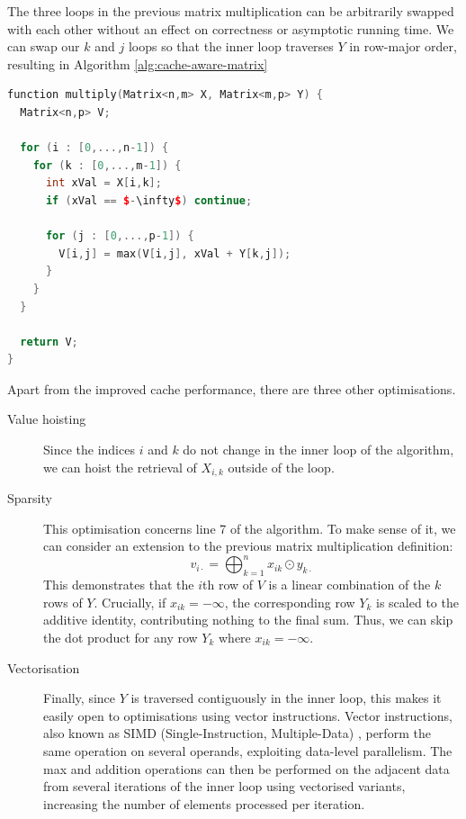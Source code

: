 The three loops in the previous matrix multiplication can be arbitrarily swapped with each other without an effect 
on correctness or asymptotic running time. We can swap our $k$ and $j$ loops so that the inner loop traverses $Y$ in 
row-major order, resulting in Algorithm \ref{alg:cache-aware-matrix}

\begin{algfloat}[ht]
\begin{lstlisting}[mathescape=true, language=C++]
function multiply(Matrix<n,m> X, Matrix<m,p> Y) {
  Matrix<n,p> V;

  for (i : [0,...,n-1]) {
    for (k : [0,...,m-1]) {
      int xVal = X[i,k];
      if (xVal == $-\infty$) continue;

      for (j : [0,...,p-1]) {
        V[i,j] = max(V[i,j], xVal + Y[k,j]);
      }
    }
  }

  return V;
}
\end{lstlisting}
\caption{Cache-aware matrix multiplication algorithm}
\label{alg:cache-aware-matrix}
\end{algfloat}

Apart from the improved cache performance, there are three other optimisations.

\begin{description}
  \item[Value hoisting] Since the indices $i$ and $k$ do not change in the inner loop of the algorithm, we can hoist the 
    retrieval of $X_{i,k}$ outside of the loop.
  \item[Sparsity] This optimisation concerns line 7 of the algorithm. To make sense of it, we can consider an extension
    to the previous matrix multiplication definition:
    $$
    v_{i \cdot} = \bigoplus_{k=1}^{n} x_{ik} \odot y_{k\cdot}
    $$
    This demonstrates that the $i$th row of $V$ is a linear combination of the $k$ rows of $Y$.
    Crucially, if $x_{ik}=-\infty$, the corresponding row $Y_k$ is scaled to the additive identity, contributing 
    nothing to the final sum. Thus, we can skip the dot product for any row $Y_k$ where $x_{ik} = -\infty$.
  \item[Vectorisation] Finally, since $Y$ is traversed contiguously in the inner loop, this makes it easily open to 
    optimisations using vector instructions. Vector instructions, also known as SIMD (Single-Instruction, Multiple-Data) \cite{flynntaxonomy},
    perform the same operation on several operands, exploiting data-level parallelism. The max and addition operations can 
    then be performed on the adjacent data from several iterations of the inner loop using vectorised variants, increasing 
    the number of elements processed per iteration.
\end{description}

